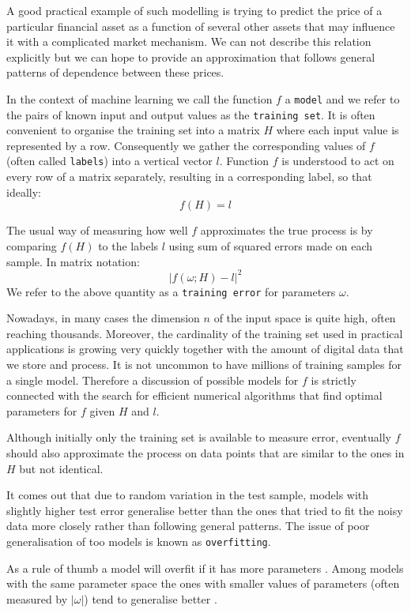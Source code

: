 \documentclass[a4paper,11pt]{article}
\theoremstyle{break}
\begin{document}
A good practical example of such modelling is trying to predict the price of a particular financial asset as a function of several other assets that may influence it with a complicated market mechanism. We can not describe this relation explicitly but we can hope to provide an approximation that follows general patterns of dependence between these prices.

In the context of machine learning we call the function $f$ a {\tt model} and we refer to the pairs of known input and output values as the {\tt training set}. It is often convenient to organise the training set into a matrix $H$ where each input value is represented by a row. Consequently we gather the corresponding values of $f$ (often called {\tt labels}) into a vertical vector $l$. Function $f$ is understood to act on every row of a matrix separately, resulting in a corresponding label, so that ideally:
    $$ f(H) = l $$

The usual way of measuring how well $f$ approximates the true process is by comparing $f(H)$ to the labels $l$ using sum of squared errors made on each sample. In matrix notation:
$$ | f(\omega; H) - l |^2 $$
We refer to the above quantity as a {\tt training error} for parameters $\omega$.

Nowadays, in many cases the dimension $n$ of the input space is quite high, often reaching thousands. Moreover, the cardinality of the training set used in practical applications is growing very quickly together with the amount of digital data that we store and process. It is not uncommon to have millions of training samples for a single model. Therefore a discussion of possible models for $f$ is strictly connected with the search for efficient numerical algorithms that find optimal parameters for $f$ given $H$ and $l$.

Although initially only the training set is available to measure error, eventually $f$ should also approximate the process on data points that are similar to the ones in $H$ but not identical.

It comes out that due to random variation in the test sample,  models with slightly higher test error generalise better than the ones that tried to fit the noisy data more closely rather than following general patterns.
The issue of poor generalisation of too  models is known as {\tt overfitting}.

As a rule of thumb a model will overfit if it has more parameters \cite[pp112-113]{goodfellow}. Among models with the same parameter space the ones with smaller values of parameters (often measured by $ | \omega | $) tend to generalise better \cite[p119]{goodfellow}.
\end{document}
